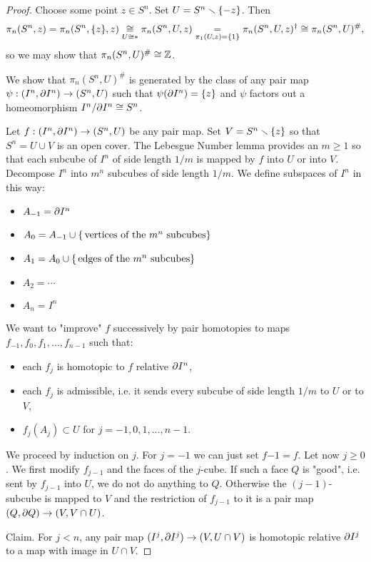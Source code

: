 \begin{proof}
Choose some point $z\in S^n$. Set $U=S^n\smallsetminus\{-z\}$. Then \[\pi_n(S^n,z)=\pi_n(S^n,\{z\},z)\underset{U\cong *}{\cong}\pi_n(S^n,U,z)\underset{\pi_1(U,z)=\{1\}}{=}\pi_n(S^n,U,z)^\dagger\cong\pi_n(S^n,U)^\#,\]
so we may show that $\pi_n(S^n,U)^\#\cong{\mathbb Z}$.

We show that $\pi_n(S^n,U)^\#$ is generated by the class of any pair map $\psi:(I^n,\partial I^n)\to(S^n,U)$ such that $\psi(\partial I^n)=\{z\}$ and $\psi$ factors out a homeomorphism $I^n/\partial I^n\cong S^n$.

Let $f:(I^n,\partial I^n)\to(S^n,U)$ be any pair map. Set $V=S^n\smallsetminus\{z\}$ so that $S^n=U\cup V$ is an open cover. The Lebesgue Number lemma provides an $m\geq1$ so that each subcube of $I^n$ of side length $1/m$ is mapped by $f$ into $U$ or into $V$. Decompose $I^n$ into $m^n$ subcubes of side length $1/m$. We define subspaces of $I^n$ in this way:
\begin{itemize}[label=-]
    \item $A_{-1}=\partial I^n$
    \item $A_0=A_{-1}\cup\{\text{\,vertices of the }m^n\text{ subcubes}\}$
    \item $A_1=A_0\cup\{\text{\,edges of the }m^n\text{ subcubes}\}$
    \item $A_2=\cdots$
    \item $A_n=I^n$
\end{itemize}
We want to "improve" $f$ successively by pair homotopies to maps $f_{-1},f_0,f_1,\dots,f_{n-1}$ such that:
\begin{itemize}
    \item each $f_j$ is homotopic to $f$ relative $\partial I^n$,
    \item each $f_j$ is admissible, i.e. it sends every subcube of side length $1/m$ to $U$ or to $V$,
    \item $f_j(A_j)\subset U$ for $j=-1,0,1,\dots,n-1$.
\end{itemize}

We proceed by induction on $j$. For $j=-1$ we can just set $f{-1}=f$. Let now $j\geq 0$. We first modify $f_{j-1}$ and the faces of the $j$-cube. If such a face $Q$ is "good", i.e. sent by $f_{j-1}$ into $U$, we do not do anything to $Q$. Otherwise the $(j-1)$-subcube is mapped to $V$ and the restriction of $f_{j-1}$ to it is a pair map $(Q,\partial Q)\to (V,V\cap U)$.

Claim. For $j<n$, any pair map $(I^j,\partial I^j)\to (V,U\cap V)$ is homotopic relative $\partial I^j$ to a map with image in $U\cap V$.


\end{proof}
